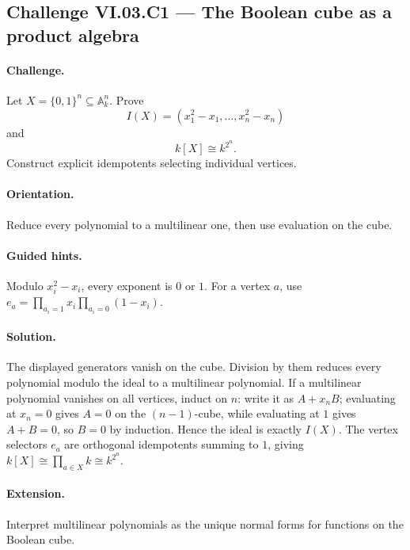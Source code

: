 \subsection*{Challenge VI.03.C1 --- The Boolean cube as a product algebra}
\label{chall:vi03-c1}
\paragraph{Challenge.}
Let \(X=\{0,1\}^n\subseteq\mathbb A_k^n\).  Prove
\[
I(X)=(x_1^2-x_1,\dots,x_n^2-x_n)
\]
and
\[
k[X]\cong k^{2^n}.
\]
Construct explicit idempotents selecting individual vertices.
\ifdefined\FullProblemDossiers
\paragraph{Orientation.} Reduce every polynomial to a multilinear one, then use evaluation on the cube.
\paragraph{Guided hints.} Modulo \(x_i^2-x_i\), every exponent is \(0\) or \(1\).  For a vertex \(a\), use \(e_a=\prod_{a_i=1}x_i\prod_{a_i=0}(1-x_i)\).
\paragraph{Solution.}
The displayed generators vanish on the cube.  Division by them reduces every polynomial
modulo the ideal to a multilinear polynomial.  If a multilinear polynomial vanishes on all
vertices, induct on \(n\): write it as \(A+x_nB\); evaluating at \(x_n=0\) gives \(A=0\) on
the \((n-1)\)-cube, while evaluating at \(1\) gives \(A+B=0\), so \(B=0\) by induction.
Hence the ideal is exactly \(I(X)\).  The vertex selectors \(e_a\) are orthogonal idempotents
summing to \(1\), giving \(k[X]\cong\prod_{a\in X}k\cong k^{2^n}\).
\paragraph{Extension.} Interpret multilinear polynomials as the unique normal forms for functions on the Boolean cube.
\fi
